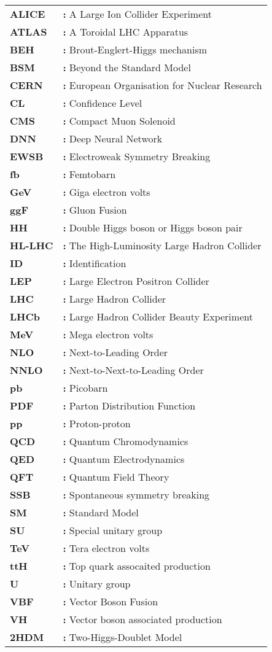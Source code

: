 \begin{tabular}{@{}p{2cm}l}
{\bf ALICE} & {\bf:} A Large Ion Collider Experiment\\
{\bf ATLAS} & {\bf:} A Toroidal LHC Apparatus\\
{\bf BEH} & {\bf:} Brout-Englert-Higgs mechanism\\
{\bf BSM} & {\bf:} Beyond the Standard Model\\
{\bf CERN} & {\bf:} European Organisation for Nuclear Research\\
{\bf CL} & {\bf:} Confidence Level\\
{\bf CMS} & {\bf:} Compact Muon Solenoid\\
{\bf DNN} & {\bf:} Deep Neural Network\\
{\bf EWSB} & {\bf:} Electroweak Symmetry Breaking\\
{\bf fb} & {\bf:} Femtobarn\\
{\bf GeV} & {\bf:} Giga electron volts\\
{\bf ggF} & {\bf:} Gluon Fusion\\
{\bf HH} & {\bf:} Double Higgs boson or Higgs boson pair\\
{\bf HL-LHC} & {\bf:} The High-Luminosity Large Hadron Collider\\
{\bf ID} & {\bf:} Identification\\
{\bf LEP} & {\bf:} Large Electron Positron Collider\\
{\bf LHC} & {\bf:} Large Hadron Collider\\
{\bf LHCb} & {\bf:} Large Hadron Collider Beauty Experiment\\
{\bf MeV} & {\bf:} Mega electron volts\\
{\bf NLO} & {\bf:} Next-to-Leading Order\\
{\bf NNLO} & {\bf:} Next-to-Next-to-Leading Order\\
{\bf pb} & {\bf:} Picobarn\\
{\bf PDF} & {\bf:} Parton Distribution Function\\
{\bf pp} & {\bf:} Proton-proton\\
{\bf QCD} & {\bf:} Quantum Chromodynamics\\
{\bf QED} & {\bf:} Quantum Electrodynamics\\
{\bf QFT} & {\bf:} Quantum Field Theory\\
{\bf SSB} & {\bf:} Spontaneous symmetry breaking\\
{\bf SM} & {\bf:} Standard Model\\
{\bf SU} & {\bf:} Special unitary group\\
{\bf TeV} & {\bf:} Tera electron volts\\
{\bf ttH} & {\bf:} Top quark assocaited production\\
{\bf U} & {\bf:} Unitary group\\
{\bf VBF} & {\bf:} Vector Boson Fusion\\
{\bf VH} & {\bf:} Vector boson associated production\\
{\bf 2HDM} & {\bf:} Two-Higgs-Doublet Model\\
\end{tabular}
